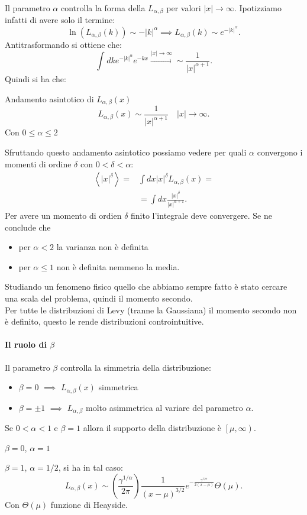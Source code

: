 Il parametro $\alpha$ controlla la forma della $L_{\alpha,\beta  }$ per valori $\left|x\right|\to \infty$. Ipotizziamo infatti di avere solo il termine:
\[
    \ln (L_{\alpha,\beta  }(k) ) \sim -\left|k\right|^\alpha \implies  L_{\alpha, \beta  }(k) \sim e^{-\left|k\right|^\alpha}
.\] 
Antitrasformando si ottiene che:
\[
    \int_{}^{} dk e^{-\left|k\right|^\alpha} e^{-kx} \xrightarrow[]{\left|x\right|\to \infty} \sim \frac{1}{\left|x\right|^{\alpha +1}}
.\] 
Quindi si ha che:
\begin{bluebox}{Andamento asintotico di $L_{\alpha,\beta  }(x)$}
   \[
       L_{\alpha,\beta  }(x) \sim \frac{1}{\left|x\right|^{\alpha +1}} \quad \left|x\right|\to \infty
   .\]  
   Con $0\le  \alpha \le 2$ 
\end{bluebox}
\noindent
Sfruttando questo andamento asintotico possiamo vedere per quali $\alpha$ convergono i momenti di ordine $\delta$ con $0<\delta <\alpha$:
\[\begin{aligned}
    \left<\left|x\right|^\delta\right> = & \int dx \left|x\right|^\delta L_{\alpha,\beta  }(x) =\\
					 & = \int  dx \frac{\left|x\right|^\delta}{\left|x\right|^{\alpha +1}}
.\end{aligned}\]
Per avere un momento di ordien $\delta$ finito l'integrale deve convergere.
Se ne conclude che 
\begin{itemize}
    \item per $\alpha <2$ la varianza non è definita
    \item per $\alpha \le 1$ non è definita nemmeno la media.
\end{itemize}
Studiando un fenomeno fisico quello che abbiamo sempre fatto è stato cercare una scala del problema, quindi il momento secondo. \\
Per tutte le distribuzioni di Levy (tranne la Gaussiana) il momento secondo non è definito, questo le rende distribuzioni controintuitive.
\paragraph{Il ruolo di $\beta  $}%
\label{par:Il ruolo di beta}
Il parametro $\beta  $   controlla la simmetria della distribuzione:
\begin{itemize}
    \item $\beta =0$ $\implies$ $L_{\alpha,\beta  }(x) $ simmetrica
    \item $\beta  = \pm 1$ $\implies$ $L_{\alpha,\beta  }$ molto asimmetrica al variare del parametro $\alpha$. 
\end{itemize}
Se $0<\alpha <1$ e $\beta =1$ allora il supporto della distribuzione è $\left[\mu,\infty\right)$.
\begin{exmp}[Lorentziana]
    $\beta =0$, $\alpha =1$ 
    
\end{exmp}
\noindent
\begin{exmp}
    $\beta =1$, $\alpha =1 /2$, si ha in tal caso:
    \[
	L_{\alpha,\beta  }(x) \sim \left(\frac{\gamma^{1 /\alpha}}{2\pi}\right) 
	\frac{1}{\left(x-\mu\right)^{3 /2}} e^{-\frac{\gamma^{1 /\alpha}}{2\left(x-\mu\right)}} \Theta (\mu) 
    .\] 
    Con $\Theta (\mu) $ funzione di Heayside.
    
\end{exmp}
\noindent
